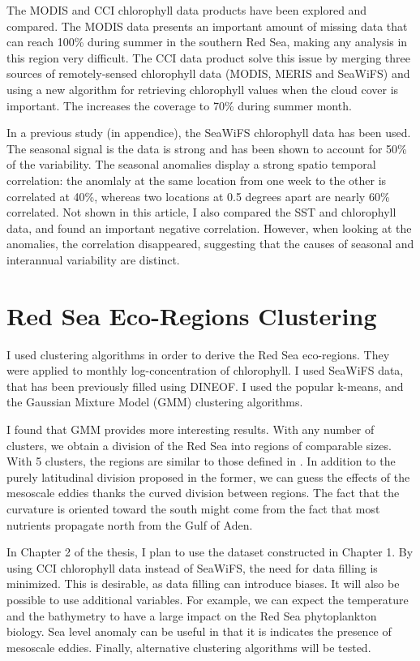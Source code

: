 The MODIS and CCI chlorophyll data products have been explored and compared.
The MODIS data presents an important amount of missing data that can reach
100\% during summer in the southern Red Sea, making any analysis in this region
very difficult. The CCI data product solve this issue by merging three sources
of remotely-sensed chlorophyll data (MODIS, MERIS and SeaWiFS) and using a new
algorithm for retrieving chlorophyll values when the cloud cover is important.
The increases the coverage to 70\% during summer month.

In a previous study (in appendice), the SeaWiFS chlorophyll data has been used.
The seasonal signal is the data is strong and has been shown to account for
50\% of the variability. The seasonal anomalies display a strong spatio
temporal correlation: the anomlaly at the same location from one week to the
other is correlated at 40\%, whereas two locations at 0.5 degrees apart are
nearly 60\% correlated. Not shown in this article, I also compared the SST and
chlorophyll data, and found an important negative correlation. However, when
looking at the anomalies, the correlation disappeared, suggesting that the
causes of seasonal and interannual variability are distinct.

\section{Red Sea Eco-Regions Clustering}

I used clustering algorithms in order to derive the Red Sea eco-regions. They
were applied to monthly log-concentration of chlorophyll. I used SeaWiFS data,
that has been previously filled using DINEOF. I used the popular k-means, and
the Gaussian Mixture Model (GMM) clustering algorithms.

I found that GMM provides more interesting results. With any number of
clusters, we obtain a division of the Red Sea into regions of comparable sizes.
With 5 clusters, the regions are similar to those defined in
\citet{Raitsos2013}. In addition to the purely latitudinal division proposed in
the former, we can guess the effects of the mesoscale eddies thanks the curved
division between regions. The fact that the curvature is oriented toward the
south might come from the fact that most nutrients propagate north from the
Gulf of Aden.

In Chapter 2 of the thesis, I plan to use the dataset constructed in Chapter 1.
By using CCI chlorophyll data instead of SeaWiFS, the need for data filling is
minimized. This is desirable, as data filling can introduce biases. It will
also be possible to use additional variables. For example, we can expect the
temperature and the bathymetry to have a large impact on the Red Sea
phytoplankton biology. Sea level anomaly can be useful in that it is indicates
the presence of mesoscale eddies. Finally, alternative clustering algorithms
will be tested.

